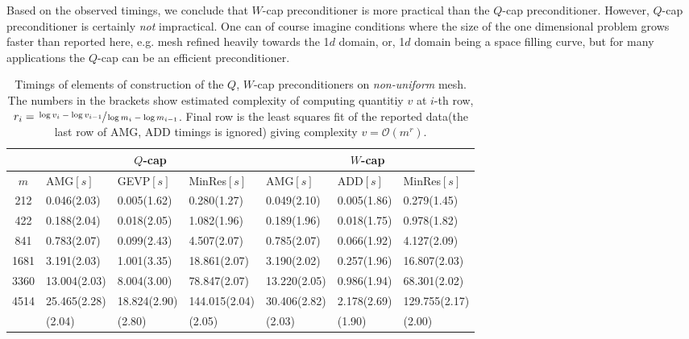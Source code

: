 \documentclass[10pt, a4paper]{article}
\begin{document}
Based on the observed timings, we conclude that $W$-cap preconditioner is more
practical than the $Q$-cap preconditioner. However, $Q$-cap preconditioner is
certainly \textit{not} impractical. One can of course imagine conditions where
the size of the one dimensional problem grows faster than reported here, e.g.
mesh refined heavily towards the 1$d$ domain, or, 1$d$ domain being a space
filling curve, but for many applications the $Q$-cap can be an efficient 
preconditioner.
%
\begin{table}[ht]
  \caption{Timings of elements of construction of the $Q$, $W$-cap
  preconditioners on \textit{non-uniform} mesh. The numbers in the brackets show 
  estimated complexity of computing quantitiy $v$ at $i$-th row,
  $r_i=\sfrac{\log{v_i}-\log{v_{i-1}}}{\log{m_i}-\log{m_{i-1}}}$. Final row is
  the least squares fit of the reported data(the last row of AMG, ADD
  timings is ignored) giving complexity $v=\mathcal{O}(m^r)$.}
\label{tab:timings_nonunif}
\footnotesize{
\begin{tabular}{c|lll|lll}
\hline
 & \multicolumn{3}{c|}{$Q$-cap} & \multicolumn{3}{c}{$W$-cap}\\
\hline
$m$ & AMG$\left[s\right]$ & GEVP$\left[s\right]$ & MinRes$\left[s\right]$ &
      AMG$\left[s\right]$ & ADD$\left[s\right]$  & MinRes$\left[s\right]$ \\
\hline
212  & 0.046(2.03)  & 0.005(1.62)  & 0.280(1.27)   & 0.049(2.10)  & 0.005(1.86) & 0.279(1.45)   \\
422  & 0.188(2.04)  & 0.018(2.05)  & 1.082(1.96)   & 0.189(1.96)  & 0.018(1.75) & 0.978(1.82)   \\
841  & 0.783(2.07)  & 0.099(2.43)  & 4.507(2.07)   & 0.785(2.07)  & 0.066(1.92) & 4.127(2.09)   \\
1681 & 3.191(2.03)  & 1.001(3.35)  & 18.861(2.07)  & 3.190(2.02)  & 0.257(1.96) & 16.807(2.03)  \\
3360 & 13.004(2.03) & 8.004(3.00)  & 78.847(2.07)  & 13.220(2.05) & 0.986(1.94) & 68.301(2.02)  \\
4514 & 25.465(2.28) & 18.824(2.90) & 144.015(2.04) & 30.406(2.82) & 2.178(2.69) & 129.755(2.17) \\
\hline
  &  (2.04) & (2.80) & (2.05) &
     (2.03) & (1.90) & (2.00)  \\
\hline
\end{tabular}
}
\end{table}
\end{document}
